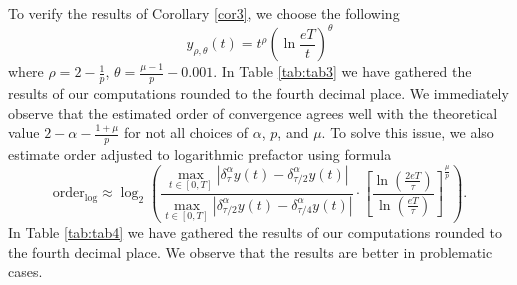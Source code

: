 \documentclass[12pt,a4paper]{article}
\theoremstyle{definition}
\begin{document}
To verify the results of Corollary \ref{cor3}, we choose the following
\begin{equation}\label{eq:test3}
    y_{\rho, \theta}(t) = t^{\rho}\left(\ln\frac{eT}{t}\right)^\theta
\end{equation}
where $\rho= 2 - \frac{1}{p}$, $\theta =\frac{\mu-1}{p} - 0.001$. In Table \ref{tab:tab3} we have gathered the results of our computations rounded to the fourth decimal place. We immediately observe that the estimated order of convergence agrees well with the theoretical value $2 - \alpha - \frac{1+\mu}{p} $ for not all choices of $\alpha$, $p$, and $\mu$. To solve this issue, we also estimate order adjusted to logarithmic prefactor using formula
\begin{equation}\label{eq:logadjusted}
\text{order}_{\text{log}} \approx \log_2 \left( \frac{\max_{t\in[0,T]}|\delta_\tau^\alpha y(t) - \delta_{\tau/2}^\alpha y(t)|}{\max_{t\in[0,T]}|\delta_{\tau/2}^\alpha y(t) - \delta_{\tau/4}^\alpha y(t)|} \cdot \left[ \frac{\ln\left(\frac{2eT}{\tau}\right)}{\ln\left(\frac{eT}{\tau}\right)} \right]^{\frac{\mu}{p}} \right).
\end{equation}
In Table \ref{tab:tab4} we have gathered the results of our computations rounded to the fourth decimal place. We observe that the results are better in problematic cases.
\end{document}
